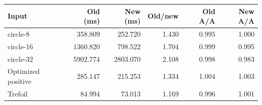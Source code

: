 \begin{tabular}{lrrrrr}
\toprule
Input & Old (ms) & New (ms) & Old/new & Old A/A & New A/A \\
\midrule
circle-8 & 358.809 & 252.720 & 1.430 & 0.995 & 1.000 \\
circle-16 & 1360.820 & 798.522 & 1.704 & 0.999 & 0.995 \\
circle-32 & 5902.774 & 2803.070 & 2.108 & 0.998 & 0.983 \\
Optimized positive & 285.147 & 215.253 & 1.334 & 1.004 & 1.003 \\
Trefoil & 84.994 & 73.013 & 1.169 & 0.996 & 1.001 \\
\bottomrule
\end{tabular}

